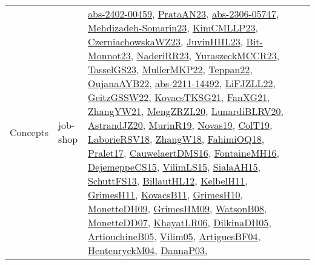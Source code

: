 {\begin{longtable}{lp{3cm}>{\raggedright}p{6cm}>{\raggedright}p{6cm}p{8cm}}
Concepts & job-shop & \href{articles/abs-2402-00459.pdf}{abs-2402-00459}\cite{abs-2402-00459}, \href{articles/PrataAN23.pdf}{PrataAN23}\cite{PrataAN23}, \href{articles/abs-2306-05747.pdf}{abs-2306-05747}\cite{abs-2306-05747}, \href{papers/Mehdizadeh-Somarin23.pdf}{Mehdizadeh-Somarin23}\cite{Mehdizadeh-Somarin23}, \href{papers/KimCMLLP23.pdf}{KimCMLLP23}\cite{KimCMLLP23}, \href{articles/CzerniachowskaWZ23.pdf}{CzerniachowskaWZ23}\cite{CzerniachowskaWZ23}, \href{papers/JuvinHHL23.pdf}{JuvinHHL23}\cite{JuvinHHL23}, \href{papers/Bit-Monnot23.pdf}{Bit-Monnot23}\cite{Bit-Monnot23}, \href{articles/NaderiRR23.pdf}{NaderiRR23}\cite{NaderiRR23}, \href{articles/YuraszeckMCCR23.pdf}{YuraszeckMCCR23}\cite{YuraszeckMCCR23}, \href{papers/TasselGS23.pdf}{TasselGS23}\cite{TasselGS23}, \href{articles/MullerMKP22.pdf}{MullerMKP22}\cite{MullerMKP22}, \href{papers/Teppan22.pdf}{Teppan22}\cite{Teppan22}, \href{papers/OujanaAYB22.pdf}{OujanaAYB22}\cite{OujanaAYB22}, \href{articles/abs-2211-14492.pdf}{abs-2211-14492}\cite{abs-2211-14492}, \href{papers/LiFJZLL22.pdf}{LiFJZLL22}\cite{LiFJZLL22}, \href{papers/GeitzGSSW22.pdf}{GeitzGSSW22}\cite{GeitzGSSW22}, \href{papers/KovacsTKSG21.pdf}{KovacsTKSG21}\cite{KovacsTKSG21}, \href{articles/FanXG21.pdf}{FanXG21}\cite{FanXG21}, \href{articles/ZhangYW21.pdf}{ZhangYW21}\cite{ZhangYW21}, \href{articles/MengZRZL20.pdf}{MengZRZL20}\cite{MengZRZL20}, \href{articles/LunardiBLRV20.pdf}{LunardiBLRV20}\cite{LunardiBLRV20}, \href{articles/AstrandJZ20.pdf}{AstrandJZ20}\cite{AstrandJZ20}, \href{papers/MurinR19.pdf}{MurinR19}\cite{MurinR19}, \href{articles/Novas19.pdf}{Novas19}\cite{Novas19}, \href{papers/ColT19.pdf}{ColT19}\cite{ColT19}, \href{articles/LaborieRSV18.pdf}{LaborieRSV18}\cite{LaborieRSV18}, \href{articles/ZhangW18.pdf}{ZhangW18}\cite{ZhangW18}, \href{articles/FahimiOQ18.pdf}{FahimiOQ18}\cite{FahimiOQ18}, \href{papers/Pralet17.pdf}{Pralet17}\cite{Pralet17}, \href{papers/CauwelaertDMS16.pdf}{CauwelaertDMS16}\cite{CauwelaertDMS16}, \href{papers/FontaineMH16.pdf}{FontaineMH16}\cite{FontaineMH16}, \href{papers/DejemeppeCS15.pdf}{DejemeppeCS15}\cite{DejemeppeCS15}, \href{papers/VilimLS15.pdf}{VilimLS15}\cite{VilimLS15}, \href{papers/SialaAH15.pdf}{SialaAH15}\cite{SialaAH15}, \href{papers/SchuttFS13.pdf}{SchuttFS13}\cite{SchuttFS13}, \href{papers/BillautHL12.pdf}{BillautHL12}\cite{BillautHL12}, \href{articles/KelbelH11.pdf}{KelbelH11}\cite{KelbelH11}, \href{papers/GrimesH11.pdf}{GrimesH11}\cite{GrimesH11}, \href{articles/KovacsB11.pdf}{KovacsB11}\cite{KovacsB11}, \href{papers/GrimesH10.pdf}{GrimesH10}\cite{GrimesH10}, \href{papers/MonetteDH09.pdf}{MonetteDH09}\cite{MonetteDH09}, \href{papers/GrimesHM09.pdf}{GrimesHM09}\cite{GrimesHM09}, \href{papers/WatsonB08.pdf}{WatsonB08}\cite{WatsonB08}, \href{papers/MonetteDD07.pdf}{MonetteDD07}\cite{MonetteDD07}, \href{articles/KhayatLR06.pdf}{KhayatLR06}\cite{KhayatLR06}, \href{papers/DilkinaDH05.pdf}{DilkinaDH05}\cite{DilkinaDH05}, \href{papers/ArtiouchineB05.pdf}{ArtiouchineB05}\cite{ArtiouchineB05}, \href{papers/Vilim05.pdf}{Vilim05}\cite{Vilim05}, \href{papers/ArtiguesBF04.pdf}{ArtiguesBF04}\cite{ArtiguesBF04}, \href{papers/HentenryckM04.pdf}{HentenryckM04}\cite{HentenryckM04}, \href{papers/DannaP03.pdf}{DannaP03}\cite{DannaP03}, 
\end{longtable}}

